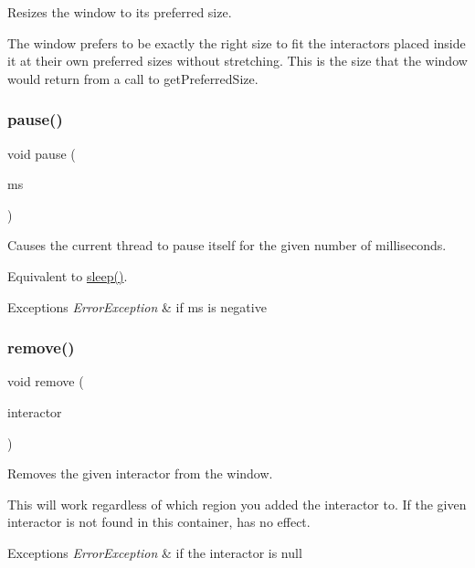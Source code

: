 Resizes the window to its preferred size. 

The window prefers to be exactly the right size to fit the interactors placed inside it at their own preferred sizes without stretching. This is the size that the window would return from a call to get\+Preferred\+Size. \mbox{\label{classGWindow_adc7d99bb2dc43b8337e89b7d54cab9d3}} 
\subsubsection{\texorpdfstring{pause()}{pause()}}
{\footnotesize\ttfamily void pause (\begin{DoxyParamCaption}\item[{double}]{ms }\end{DoxyParamCaption})\hspace{0.3cm}{\ttfamily [virtual]}}



Causes the current thread to pause itself for the given number of milliseconds. 

Equivalent to \mbox{\hyperlink{classGWindow_aa3381590c1ef33c08000c2fbb2bf0dd0}{sleep()}}. 
\begin{DoxyExceptions}{Exceptions}
{\em Error\+Exception} & if ms is negative \\
\hline
\end{DoxyExceptions}
\mbox{\label{classGWindow_a1c12b1fde5c2ef10d79d4ee51e670efa}} 
\subsubsection{\texorpdfstring{remove()}{remove()}\hspace{0.1cm}{\footnotesize\ttfamily [1/4]}}
{\footnotesize\ttfamily void remove (\begin{DoxyParamCaption}\item[{\mbox{\hyperlink{classGInteractor}{G\+Interactor}} $\ast$}]{interactor }\end{DoxyParamCaption})\hspace{0.3cm}{\ttfamily [virtual]}}



Removes the given interactor from the window. 

This will work regardless of which region you added the interactor to. If the given interactor is not found in this container, has no effect. 
\begin{DoxyExceptions}{Exceptions}
{\em Error\+Exception} & if the interactor is null \\
\hline
\end{DoxyExceptions}
\mbox{\label{classGWindow_ade2376c458ac401a0bd2dbe44271509e}} 
